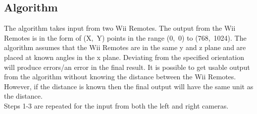 \documentclass[a4paper,twoside]{article}
\begin{document}
\subsection{Algorithm}
\noindent The algorithm takes input from two Wii Remotes. The output from the
Wii Remotes is in the form of (X,~Y) points in the range (0,~0) to (768,~1024).
The algorithm assumes that the Wii Remotes are in the same y and z plane and
are placed at known angles in the x plane. Deviating from the specified
orientation will produce errors/an error in the final result. It is possible to
get usable output from the algorithm without knowing the distance between the
Wii Remotes. However, if the distance is known then the final output will have
the same unit as the distance.  \\

\noindent Steps 1-3 are repeated for the input from both the left and right
cameras.  \newenvironment{indenteddescription} {\begin{list}{}{
\setlength{\labelwidth}{0pt} \setlength{\itemindent}{-37pt}
\setlength{\leftmargin}{37pt} \setlength{\listparindent}{\parindent}
\renewcommand{\makelabel}{\descriptionlabel} }} {\end{list}}
\end{document}
